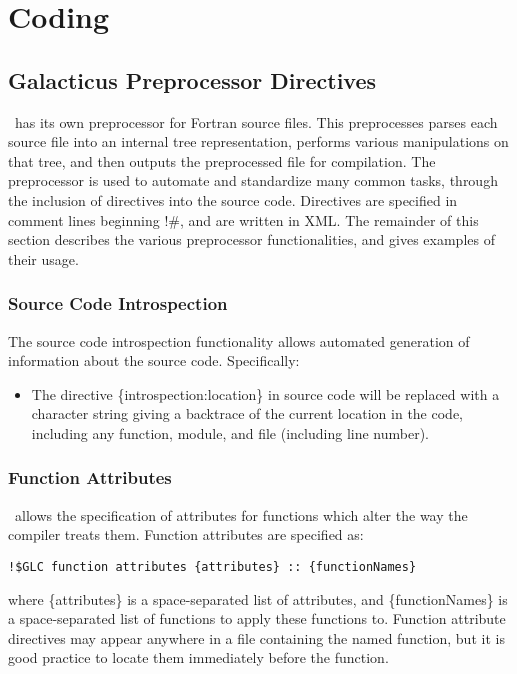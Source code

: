 \chapter{Coding \glc}

\section{Galacticus Preprocessor Directives}

\glc\ has its own preprocessor for Fortran source files. This preprocesses parses each source file into an internal tree representation, performs various manipulations on that tree, and then outputs the preprocessed file for compilation. The preprocessor is used to automate and standardize many common tasks, through the inclusion of directives into the source code. Directives are specified in comment lines beginning {\normalfont \ttfamily !\#}, and are written in XML. The remainder of this section describes the various preprocessor functionalities, and gives examples of their usage.

\subsection{Source Code Introspection}

The source code introspection functionality allows automated generation of information about the source code. Specifically:
\begin{itemize}
\item The directive {\normalfont \ttfamily \{introspection:location\}} in source code will be replaced with a character string giving a backtrace of the current location in the code, including any function, module, and file (including line number).
\end{itemize}

\subsection{Function Attributes}

\glc\ allows the specification of attributes for functions which alter the way the compiler treats them. Function attributes are specified as:
\begin{verbatim}
!$GLC function attributes {attributes} :: {functionNames}
\end{verbatim}
where {\normalfont \ttfamily \{attributes\}} is a space-separated list of attributes, and {\normalfont \ttfamily \{functionNames\}} is a space-separated list of functions to apply these functions to. Function attribute directives may appear anywhere in a file containing the named function, but it is good practice to locate them immediately before the function.

